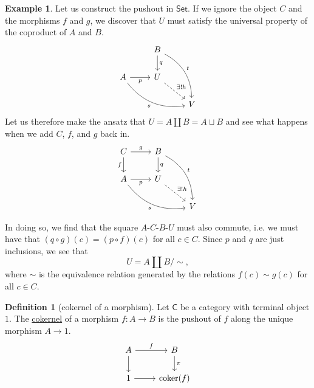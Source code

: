 \documentclass[a4paper]{report}
\newcommand{\defn}[1]{\ul{#1}}
\newcommand{\coker}{\mathrm{coker}}
\theoremstyle{definition}
\newtheorem{definition}{Definition}[section]
\newtheorem{example}{Example}[section]
\theoremstyle{plain}
\theoremstyle{remark}
\begin{document}
\begin{example}
  Let us construct the pushout in $\mathsf{Set}$. If we ignore the object $C$ and the morphisms $f$ and $g$, we discover that $U$ must satisfy the universal property of the coproduct of $A$ and $B$. 
  \begin{equation*}
    \begin{tikzcd}
      & B \arrow[d, "q"] \arrow[ddr, bend left, "t"] & \\
      A \arrow[drr, bend right, swap, "s"] \arrow[r, swap, "p"] & U \arrow[dr, dashed, "\exists!h"] & \\
      & & V
    \end{tikzcd}
  \end{equation*}
  Let us therefore make the ansatz that $U = A \amalg B = A \sqcup B$ and see what happens when we add $C$, $f$, and $g$ back in. 
  \begin{equation*}
    \begin{tikzcd}
      C \arrow[r, "g"] \arrow[d, swap, "f"] & B \arrow[d, "q"] \arrow[ddr, bend left, "t"] & \\
      A \arrow[drr, bend right, swap, "s"] \arrow[r, swap, "p"] & U \arrow[dr, dashed, "\exists!h"] & \\
      & & V
    \end{tikzcd}
  \end{equation*}

  In doing so, we find that the square $A$-$C$-$B$-$U$ must also commute, i.e. we must have that $(q \circ g) (c) = (p \circ f)(c)$ for all $c \in C$. Since $p$ and $q$ are just inclusions, we see that
  \begin{equation*}
    U = A \amalg B / \sim,
  \end{equation*}
  where $\sim$ is the equivalence relation generated by the relations $f(c) \sim g(c)$ for all $c\in C$.
\end{example}

\begin{definition}[cokernel of a morphism]
  \label{def:cokernalofmorphism}
  Let $\mathsf{C}$ be a category with terminal object $1$. The \defn{cokernel} of a morphism $f\colon A \to B$ is the pushout of $f$ along the unique morphism $A \to 1$.
  \begin{equation*}
    \begin{tikzcd}
      A \arrow[r, "f"] \arrow[d] & B \arrow[d, "\pi"] \\
      1 \arrow[r] & \coker(f)
    \end{tikzcd}
  \end{equation*}
\end{definition}
\end{document}
